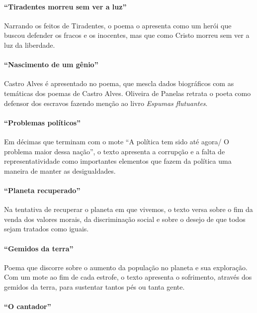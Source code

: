 \paragraph{``Tiradentes morreu sem ver a luz''}

Narrando os feitos de Tiradentes, o poema o apresenta como um herói que
buscou defender os fracos e os inocentes, mas que como Cristo morreu
sem ver a luz da liberdade.

\paragraph{``Nascimento de um gênio''}

Castro Alves é apresentado no poema, que mescla dados biográficos com
as temáticas dos poemas de Castro Alves. Oliveira de Panelas retrata o poeta como
defensor dos escravos fazendo menção ao livro \textit{Espumas flutuantes}.

\paragraph{``Problemas políticos''}

Em décimas que terminam com o mote ``A política tem
sido até agora/ O problema maior dessa nação'', o
texto apresenta a corrupção e a falta de representatividade como
importantes elementos que fazem da política uma maneira de manter as
desigualdades.

\paragraph{``Planeta recuperado''}

Na tentativa de recuperar o planeta em que vivemos, o texto versa sobre o
fim da venda dos valores morais, da discriminação social e sobre o
desejo de que todos sejam tratados como iguais.

\paragraph{``Gemidos da terra''}

Poema que discorre sobre o aumento da população no planeta e sua
exploração. Com um mote ao fim de cada estrofe, o texto
apresenta o sofrimento, através dos gemidos da terra, para sustentar
tantos pés ou tanta gente.

\paragraph{``O cantador''}

